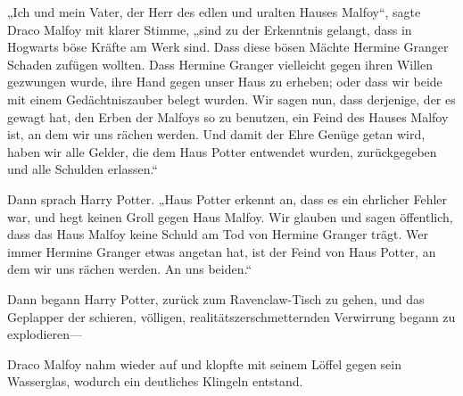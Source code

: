 „Ich und mein Vater, der Herr des edlen und uralten Hauses Malfoy“, sagte Draco Malfoy mit klarer Stimme, „sind zu der Erkenntnis gelangt, dass in Hogwarts böse Kräfte am Werk sind. Dass diese bösen Mächte Hermine Granger Schaden zufügen wollten. Dass Hermine Granger vielleicht gegen ihren Willen gezwungen wurde, ihre Hand gegen unser Haus zu erheben; oder dass wir beide mit einem Gedächtniszauber belegt wurden. Wir sagen nun, dass derjenige, der es gewagt hat, den Erben der Malfoys so zu benutzen, ein Feind des Hauses Malfoy ist, an dem wir uns rächen werden. Und damit der Ehre Genüge getan wird, haben wir alle Gelder, die dem Haus Potter entwendet wurden, zurückgegeben und alle Schulden erlassen.“

Dann sprach Harry Potter.
„Haus Potter erkennt an, dass es ein ehrlicher Fehler war, und hegt keinen Groll gegen Haus Malfoy. Wir glauben und sagen öffentlich, dass das Haus Malfoy keine Schuld am Tod von Hermine Granger trägt. Wer immer Hermine Granger etwas angetan hat, ist der Feind von Haus Potter, an dem wir uns rächen werden. An uns beiden.“

Dann begann Harry Potter, zurück zum Ravenclaw-Tisch zu gehen, und das Geplapper der schieren, völligen, realitätszerschmetternden Verwirrung begann zu explodieren—

Draco Malfoy nahm wieder auf und klopfte mit seinem Löffel gegen sein Wasserglas, wodurch ein deutliches Klingeln entstand.

